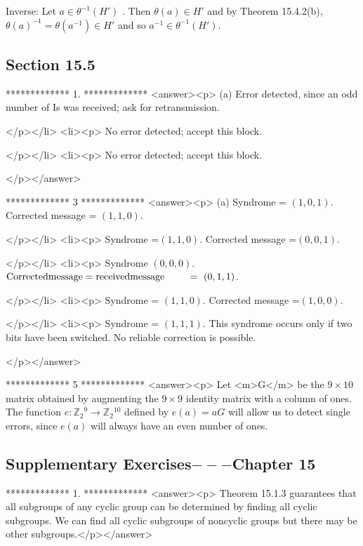 Inverse: Let \(a\in \theta ^{-1}(H')\) . Then \(\theta (a)\in H'\) and by Theorem 15.4.2(b), \(\theta (a)^{-1}= \theta \left(a^{-1}\right)\in H'\)
and so \(a^{-1}\in \theta ^{-1}(H')\).


\subsection{Section 15.5}

*************
1.
*************
<answer><p> (a) Error detected, since an odd number of Is was received; ask for retransmission.

</p></li>
<li><p> No error detected; accept this block.

</p></li>
<li><p> No error detected; accept this block.

</p></answer>


*************
3
*************
<answer><p> (a) Syndrome = \((1, 0, 1)\). Corrected message = \((1, 1, 0)\).

</p></li>
<li><p> Syndrome =\((1, 1,0)\). Corrected message =\((0, 0, 1)\).

</p></li>
<li><p> Syndrome \((0,0,0)\). \(\text{Corrected} \text{message} =\text{received} \text{message}\\
\\
\text{$\quad \quad $        }=\text{   }(0, 1, 1)\).

</p></li>
<li><p> Syndrome = \((1, 1,0)\). Corrected message =\((1, 0, 0)\).

</p></li>
<li><p> Syndrome = \((1, 1, 1)\). This syndrome occurs only if two bits have been switched. No reliable correction is possible.

</p></answer>


*************
5
*************
<answer><p> Let <m>G</m> be the \(9\times 10\) matrix obtained by augmenting the \(9\times 9\) identity matrix with a column of ones. The function \(e
:\mathbb{Z}_2{}^9\to \mathbb{Z}_2{}^{10}\)  defined by \(e(a) = a G\) will allow us to detect single errors, since \(e(a)\) will always have an
even number of ones.


\subsection{Supplementary Exercises$---$Chapter 15}

*************
1.
*************
<answer><p> Theorem 15.1.3 guarantees that all subgroups of any cyclic group can be determined by finding all cyclic subgroups. We can find all cyclic subgroups
of noncyclic groups but there may be other subgroups.</p></answer>


